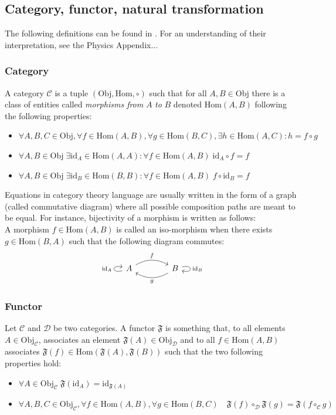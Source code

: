\documentclass[a4paper,11pt]{article}
\numberwithin{equation}{section}
\theoremstyle{definition}
\begin{document}
    \subsection{Category, functor, natural transformation} \label{AnMaCat}
    The following definitions can be found in \cite{AlgLang}. For an understanding of their interpretation, see the Physics Appendix...
    \subsubsection{Category}
    A category $\mathcal{C}$ is a tuple $(\mathrm{Obj},\mathrm{Hom},\circ)$ such that for all $A,B \in \mathrm{Obj}$ there is a class of entities called \emph{morphisms from} $A$ \emph{to} $B$ denoted $\mathrm{Hom}(A,B)$ following the following properties:
    \begin{itemize}
        \item $\forall A, B, C \in \mathrm{Obj}, \forall f\in \mathrm{Hom}(A,B), \forall g\in \mathrm{Hom}(B,C), \exists h \in \mathrm{Hom} (A,C) : h=f\circ g$
        \item $\forall A,B \in \mathrm{Obj} \; \exists \mathrm{id}_A \in \mathrm{Hom}(A,A): \forall f \in \mathrm{Hom}(A,B) \; \mathrm{id}_A\circ f=f$
        \item $\forall A,B \in \mathrm{Obj} \; \exists \mathrm{id}_B \in \mathrm{Hom}(B,B): \forall f \in \mathrm{Hom}(A,B) \; f\circ \mathrm{id}_B=f$
    \end{itemize}
    Equations in category theory language are usually written in the form of a graph (called commutative diagram) where all possible composition paths are meant to be equal. For instance, bijectivity of a morphism is written as follows:\\
    A morphism $f \in \mathrm{Hom}(A,B)$ is called an iso-morphism when there exists $g \in \mathrm{Hom}(B,A)$ such that the following diagram commutes:
    $$\begin{tikzcd}[column sep=4em,row sep=4em,/tikz/column 2/.style={column sep=2em}]
\arrow[loop left]{l}{\mathrm{id}_A} A \arrow[r,bend left,"f"]
    & B \arrow[l,bend left,"g"] \arrow[loop right]{r}{\mathrm{id}_B}
\end{tikzcd}$$

\subsubsection{Functor}
    Let $\mathcal{C}$ and $\mathcal{D}$ be two categories. A functor $\mathfrak{F}$ is something that, to all elements $A\in\mathrm{Obj}_\mathcal{C}$, associates an element $\mathfrak{F}(A)\in\mathrm{Obj}_\mathcal{D}$ and to all $f \in \mathrm{Hom}(A,B)$ associates $\mathfrak{F}(f)\in\mathrm{Hom}(\mathfrak{F}(A),\mathfrak{F}(B))$ such that the two following properties hold:
    \begin{itemize}
        \item $\forall A \in \mathrm{Obj}_\mathcal{C}\; \mathfrak{F}(\mathrm{id}_A)=\mathrm{id}_{\mathfrak{F}(A)}$
        \item $\forall A,B,C \in \mathrm{Obj}_\mathcal{C}, \forall f \in \mathrm{Hom}(A,B), \forall g \in \mathrm{Hom}(B,C)\quad \mathfrak{F}(f)\circ_\mathcal{D}\mathfrak{F}(g)=\mathfrak{F}(f\circ_\mathcal{C}g)$
    \end{itemize}
\end{document}
